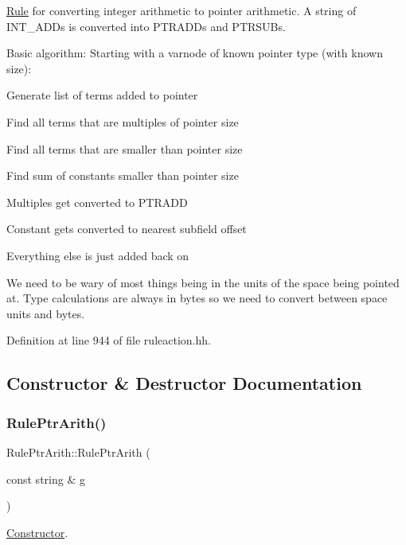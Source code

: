 \mbox{\hyperlink{class_rule}{Rule}} for converting integer arithmetic to pointer arithmetic. A string of I\+N\+T\+\_\+\+A\+D\+Ds is converted into P\+T\+R\+A\+D\+Ds and P\+T\+R\+S\+U\+Bs.

Basic algorithm\+: Starting with a varnode of known pointer type (with known size)\+:
\begin{DoxyItemize}
\item Generate list of terms added to pointer
\item Find all terms that are multiples of pointer size
\item Find all terms that are smaller than pointer size
\item Find sum of constants smaller than pointer size
\item Multiples get converted to P\+T\+R\+A\+DD
\item Constant gets converted to nearest subfield offset
\item Everything else is just added back on
\end{DoxyItemize}

We need to be wary of most things being in the units of the space being pointed at. Type calculations are always in bytes so we need to convert between space units and bytes. 

Definition at line 944 of file ruleaction.\+hh.



\subsection{Constructor \& Destructor Documentation}
\mbox{\label{class_rule_ptr_arith_a139210db9ccd8becc85ce3ec5467f04a}} 
\subsubsection{\texorpdfstring{RulePtrArith()}{RulePtrArith()}}
{\footnotesize\ttfamily Rule\+Ptr\+Arith\+::\+Rule\+Ptr\+Arith (\begin{DoxyParamCaption}\item[{const string \&}]{g }\end{DoxyParamCaption})\hspace{0.3cm}{\ttfamily [inline]}}



\mbox{\hyperlink{class_constructor}{Constructor}}. 




